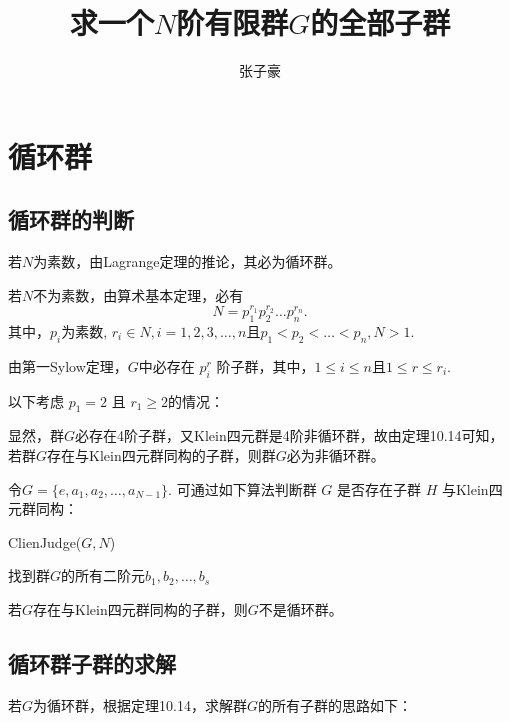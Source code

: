 \documentclass[11pt, a4paper, oneside，UTF8]{article}
\title{求一个$N$阶有限群$G$的全部子群}
\author{张子豪\qquad1120203325}
\date{}
\begin{document}
\maketitle

 
\section{循环群}

\subsection{循环群的判断}                       
若$N$为素数，由Lagrange定理的推论，其必为循环群。

若$N$不为素数，由算术基本定理，必有
$$ N=p_{1}^{r_{1}}p_{2}^{r_{2}}\ldots p_{n}^{r_{n}}.$$
其中，$p_{i}$为素数, $r_{i}\in N, i=1,2,3,\ldots ,n$且$p_{1}<p_{2}<\ldots<p_{n}, N>1.$

由第一Sylow定理，$G$中必存在 $p_{i}^{r}$ 阶子群，其中，$1\leq i\leq n$且$1\leq r\leq r_{i}$.

以下考虑 $p_{1}=2$ 且 $r_{1}\geq 2$的情况：

显然，群$G$必存在4阶子群，又Klein四元群是4阶非循环群，故由定理10.14可知，若群$G$存在与Klein四元群同构的子群，则群$G$必为非循环群。

令$G=\{e,a_{1},a_{2},\ldots ,a_{N-1}\}.$
可通过如下算法判断群 $G$ 是否存在子群 $H$ 与Klein四元群同构：

\begin{algorithm}
	\caption{ClienJudge($G,N$)}
	\begin{algorithmic}[1]
		\STATE 找到群$G$的所有二阶元$b_{1},b_{2},\ldots ,b_{s}$
			\RETURN \FALSE
		\ENDIF

						\RETURN \TRUE
					\ENDIF
				\ENDFOR
			\ENDFOR
		\ENDFOR
		\RETURN \FALSE
	\end{algorithmic}
\end{algorithm}


若$G$存在与Klein四元群同构的子群，则$G$不是循环群。



\subsection{循环群子群的求解}

若$G$为循环群，根据定理10.14，求解群$G$的所有子群的思路如下：
\end{document}
